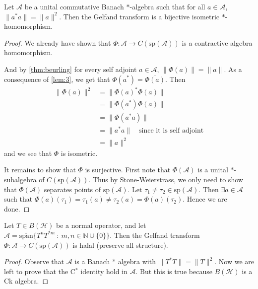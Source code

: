 \begin{theorem}
  Let $\mathcal{A}$ be a unital commutative Banach $*$-algebra such
  that for all $a \in \mathcal{A}$, $\|a^*a\| = \|a\|^2$. Then the
  Gelfand transform is a bijective isometric $*$-homomorphism.
\end{theorem}
\begin{proof}
  We already have shown that $\Phi: \mathcal{A} \to
  C(\textrm{sp}(\mathcal{A}))$ is a contractive algebra homomorphism.

  And by \autoref{thm:beurling} for every self adjoint $a \in
  \mathcal{A}$, $\|\Phi(a)\| = \|a\|$. As a consequence of
  \autoref{lem:3}, we get that $\Phi(a^*) = \overline{\Phi(a)}$. Then
  \begin{align*}
    \|\Phi(a)\|^2 &= \|\Phi(a)^* \Phi(a)\| \\
    &= \|\Phi(a^*) \Phi(a)\| \\
    &= \|\Phi(a^* a)\| \\
    &= \|a^*a\| \quad \textrm{since it is self adjoint} \\
    &= \|a\|^2
  \end{align*}
  and we see that $\Phi$ is isometric.

  It remains to show that $\Phi$ is surjective. First note that
  $\Phi(\mathcal{A})$ is a unital $*$-subalgebra of
  $C(\textrm{sp}(\mathcal{A}))$. Thus by Stone-Weierstrass, we only
  need to show that $\Phi(\mathcal{A})$ separates points of
  $\textrm{sp}(\mathcal{A})$. Let $\tau_1 \neq \tau_2 \in
  \textrm{sp}(\mathcal{A})$. Then $\exists a \in \mathcal{A}$ such
  that $\Phi(a)(\tau_1) = \tau_1(a) \neq \tau_2(a) =
  \Phi(a)(\tau_2)$. Hence we are done.
\end{proof}

\begin{corollary}
  \label{cor:algebra_spanned_by_normal_operator_isomorphic_to_continuous_functions_in_spectrum}
  Let $T \in B(\mathcal{H})$ be a normal operator, and let
  $\mathcal{A} = \overline{\textrm{span}} \{ T^n T^{*m}  \ : \ m, n
  \in \mathbb{N} \cup \{ 0 \}  \}$. Then the Gelfand transform $\Phi:
  \mathcal{A} \to C(\textrm{sp}(\mathcal{A}))$ is halal (preserve all
  structure).
\end{corollary}
\begin{proof}
  Observe that $\mathcal{A}$ is a Banach * algebra with $\|T^*T\| =
  \|T\|^2$. Now we are left to prove that the C$^*$ identity hold in
  $\mathcal{A}$. But this is true because $B(\mathcal{H})$ is a Ck algebra.
\end{proof}

